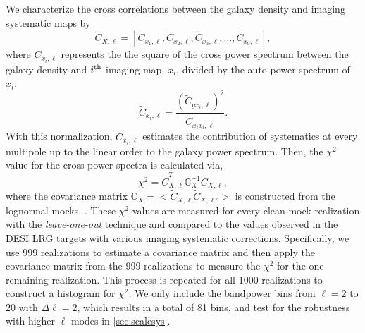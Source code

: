 We characterize the cross correlations between the galaxy density and imaging systematic maps by
\begin{equation}
\tilde{C}_{X, \ell} = [\tilde{C}_{x_{1}, \ell}, \tilde{C}_{x_{2}, \ell}, \tilde{C}_{x_{3}, \ell}, ..., \tilde{C}_{x_{9}, \ell}],
\end{equation}
where $\tilde{C}_{x_{i}, \ell}$ represents the the square of the cross power spectrum between the galaxy density and $i^{\rm th}$ imaging map, $x_{i}$, divided by the auto power spectrum of $x_{i}$:
\begin{equation}\label{eq:cx}
\tilde{C}_{x_{i}, \ell} = \frac{(\tilde{C}_{gx_{i}, \ell})^{2}}{\tilde{C}_{x_{i}x_{i},\ell}}.
\end{equation}
With this normalization, $\tilde{C}_{x_{i}, \ell}$ estimates the contribution of systematics at every multipole up to the linear order to the galaxy power spectrum. Then, the $\chi^{2}$ value for the cross power spectra is calculated via,
\begin{equation}\label{eq:cx_chi2}
\chi^{2} = \tilde{C}^{T}_{X, \ell} \mathbb{C}_{X}^{-1} \tilde{C}_{X, \ell},
\end{equation}
where the covariance matrix $\mathbb{C}_{X} = < \tilde{C}_{X, \ell} \tilde{C}_{X, \ell'} >$ is constructed from the lognormal mocks. . These $\chi^{2}$ values are measured for every clean mock realization with the \textit{leave-one-out} technique and compared to the values observed in the DESI LRG targets with various imaging systematic corrections. Specifically, we use 999 realizations to estimate a covariance matrix and then apply the covariance matrix from the 999 realizations to measure the $\chi^{2}$ for the one remaining realization. This process is repeated for all 1000 realizations to construct a histogram for $\chi^{2}$. We only include the bandpower bins from $\ell=2$ to $20$ with $\Delta\ell=2$, which results in a total of 81 bins, and test for the robustness with higher $\ell$ modes in \ref{sec:scalesys}. 

